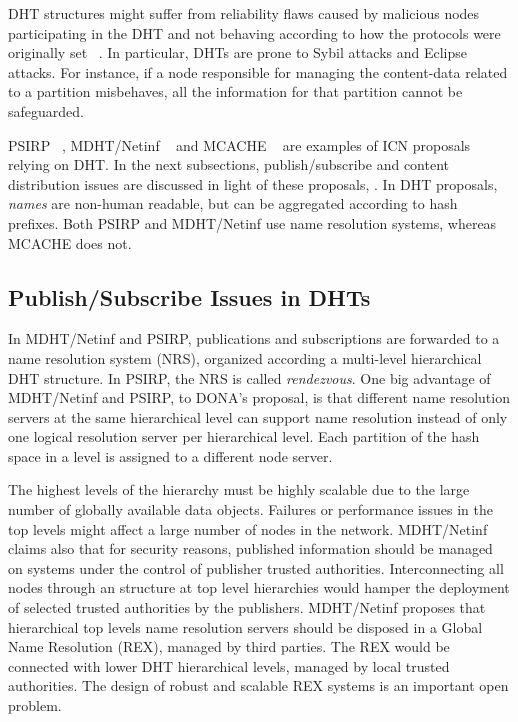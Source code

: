 DHT structures might suffer from reliability flaws 
caused by malicious nodes participating in the DHT and not behaving according to how the protocols were originally set ~\cite{securitydht}.
In particular, DHTs are prone to Sybil attacks and Eclipse attacks. For instance, if a node responsible for managing
the content-data related to a partition misbehaves, all the information for that partition cannot be safeguarded.



PSIRP ~\cite{psirp}, MDHT/Netinf ~\cite{mdht} and MCACHE  ~\cite{multicache} are examples of ICN proposals relying on DHT. 
In the next subsections, publish/subscribe and content distribution issues are discussed in light of these proposals, . 
In DHT proposals, \emph{names} are non-human readable, but can be aggregated according to hash prefixes.  
Both PSIRP and MDHT/Netinf use name resolution systems, whereas MCACHE does not.


\subsection{Publish/Subscribe Issues in DHTs}

In MDHT/Netinf and PSIRP, publications and subscriptions are forwarded to a name resolution system (NRS),
organized according a multi-level hierarchical DHT structure. In PSIRP, the NRS is called \emph{rendezvous}.  
One big advantage of MDHT/Netinf and PSIRP, to DONA's proposal, is that different name resolution servers at the same hierarchical level 
can support name resolution instead of only one logical resolution server per hierarchical level. Each partition of the hash space in a level 
is assigned to a different node server. 


The highest levels of the hierarchy must be highly scalable due to the large number of globally available data objects. 
Failures or performance issues in the top levels might affect a large number of nodes in the network.  MDHT/Netinf claims also that for security reasons, published information should be managed on systems under the control of 
publisher trusted authorities. Interconnecting all nodes through an structure at top level hierarchies would hamper the deployment
of selected trusted authorities by the publishers. MDHT/Netinf proposes that hierarchical top levels name resolution servers should be
disposed in a Global Name Resolution (REX), managed by third parties. The REX would be connected with lower DHT hierarchical levels,
managed by local trusted authorities. The design of robust and scalable REX systems is an important open problem. 



